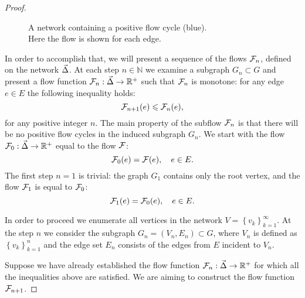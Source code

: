 \documentclass[12pt]{amsart}
\begin{document}
\begin{proof}
\begin{figure}
\begin{center}
        \caption{A network containing a positive flow cycle (blue).\\ Here the flow is shown for each edge.} 
        \label{positive-flow}
        \end{center}
      \end{figure}
      In order to accomplish that, we will present a sequence of the flows $\mathcal{F}_{n}$, defined on the network $\vec{\Delta}$.
      At each step $n \in \mathbb{N}$ we examine a subgraph $G_n \subset G$ and present a flow function $\mathcal{F}_{n}: \vec{\Delta} \to \mathbb{R}^{+}$
        such that $\mathcal{F}_{n}$ is monotone: for any edge $e \in E$ the following inequality holds:
      \[
        \mathcal{F}_{n+1}(e) \leqslant \mathcal{F}_{n}(e),
      \]
      for any positive integer $n$.
      The main property of the subflow $\mathcal{F}_{n}$ is that there will be no positive flow cycles in the induced subgraph
      $G_n$.
      We start with the flow $\mathcal{F}_{0}:\vec{\Delta} \to \mathbb{R}^+$ equal to the flow $\mathcal{F}$:
      \[
        \mathcal{F}_{0}(e) = \mathcal{F}(e), \quad e \in E.
      \]
      The first step $n = 1$ is trivial: the graph $G_1$ contains only the root vertex, and
        the flow $\mathcal{F}_{1}$ is equal to $\mathcal{F}_{0}$:
      \[
        \mathcal{F}_{1}(e) = \mathcal{F}_{0}(e), \quad e \in E.
      \]

      In order to proceed we enumerate all vertices in the network $V = \left\{v_k\right\}_{k=1}^\infty$.
      At the step $n$ we consider the subgraph $G_n = (V_n, E_n) \subset G$, where $V_n$ is defined as $\left\{v_k\right\}_{k=1}^n$
        and the edge set $E_n$ consists of the edges from $E$ incident to $V_n$.

      Suppose we have already established the flow function $\mathcal{F}_{n}: \vec{\Delta} \to \mathbb{R}^{+}$ for which
        all the inequalities above are satisfied.
      We are aiming to construct the flow function $\mathcal{F}_{n+1}$.


\end{proof}
\end{document}
